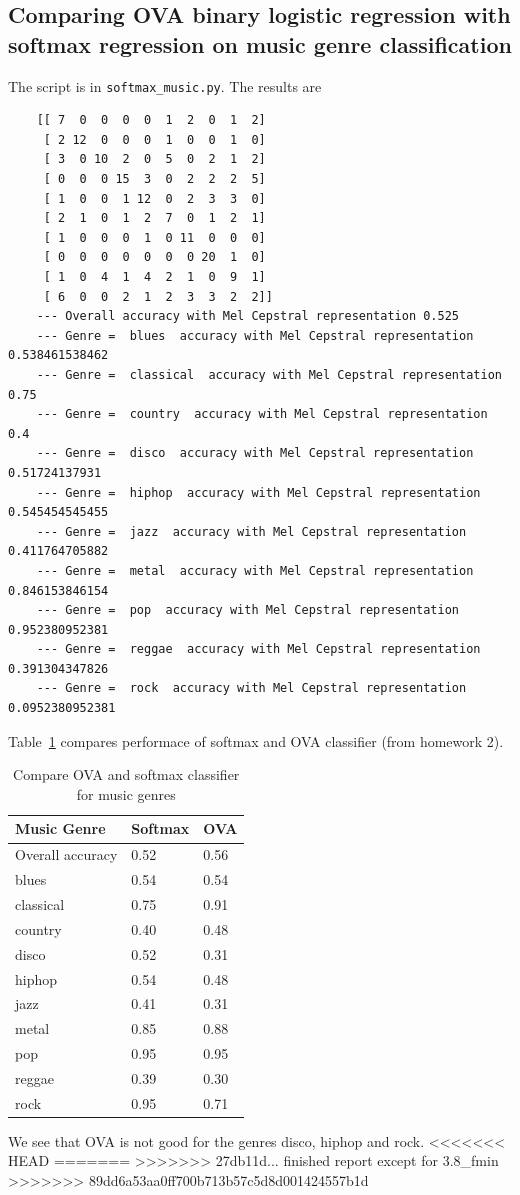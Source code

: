 \documentclass{article}
\begin{document}
\subsection{Comparing OVA binary logistic regression with softmax regression on music genre classification}
The script is in \verb|softmax_music.py|. The results are
\begin{lstlisting}
	[[ 7  0  0  0  0  1  2  0  1  2]
	 [ 2 12  0  0  0  1  0  0  1  0]
	 [ 3  0 10  2  0  5  0  2  1  2]
	 [ 0  0  0 15  3  0  2  2  2  5]
	 [ 1  0  0  1 12  0  2  3  3  0]
	 [ 2  1  0  1  2  7  0  1  2  1]
	 [ 1  0  0  0  1  0 11  0  0  0]
	 [ 0  0  0  0  0  0  0 20  1  0]
	 [ 1  0  4  1  4  2  1  0  9  1]
	 [ 6  0  0  2  1  2  3  3  2  2]]
	--- Overall accuracy with Mel Cepstral representation 0.525
	--- Genre =  blues  accuracy with Mel Cepstral representation 0.538461538462
	--- Genre =  classical  accuracy with Mel Cepstral representation 0.75
	--- Genre =  country  accuracy with Mel Cepstral representation 0.4
	--- Genre =  disco  accuracy with Mel Cepstral representation 0.51724137931
	--- Genre =  hiphop  accuracy with Mel Cepstral representation 0.545454545455
	--- Genre =  jazz  accuracy with Mel Cepstral representation 0.411764705882
	--- Genre =  metal  accuracy with Mel Cepstral representation 0.846153846154
	--- Genre =  pop  accuracy with Mel Cepstral representation 0.952380952381
	--- Genre =  reggae  accuracy with Mel Cepstral representation 0.391304347826
	--- Genre =  rock  accuracy with Mel Cepstral representation 0.0952380952381
\end{lstlisting}

Table~\ref{table:3.8ova} compares performace of softmax and OVA classifier (from homework 2).

\begin{table}[h]
\caption{Compare OVA and softmax classifier for music genres} \centering
\begin{tabular}{|l|l|l|}
\hline
Music Genre & Softmax & OVA\\
\hline\hline
Overall accuracy & 0.52 & 0.56 \\
blues  & 0.54 & 0.54 \\

classical  & 0.75 & 0.91\\

country  & 0.40 & 0.48 \\

disco  & 0.52 & 0.31 \\

hiphop  & 0.54 & 0.48 \\

jazz  & 0.41 & 0.31 \\

metal  & 0.85 & 0.88 \\

pop & 0.95 & 0.95 \\

reggae & 0.39 & 0.30 \\

rock & 0.95 & 0.71 \\
\hline
\end{tabular} \label{table:3.8ova}
\end{table}

We see that OVA is not good for the genres disco, hiphop and rock.
<<<<<<< HEAD
=======
>>>>>>> 27db11d... finished report except for 3.8_fmin
>>>>>>> 89dd6a53aa0ff700b713b57c5d8d001424557b1d
\end{document}

